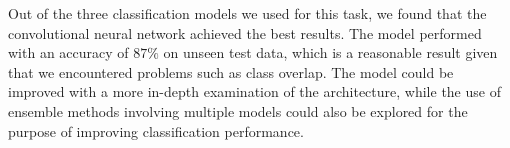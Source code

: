 \documentclass[../main.tex]{subfiles}
\begin{document}
Out of the three classification models we used for this task, we 
found that the convolutional neural network achieved the best 
results. The model performed with an accuracy of $87\%$ on unseen 
test data, which is a reasonable result given that we encountered 
problems such as class overlap. The model could be improved with a 
more in-depth examination of the architecture, while the use of 
ensemble methods involving multiple models could also be explored for the purpose of improving classification performance.
\end{document}
